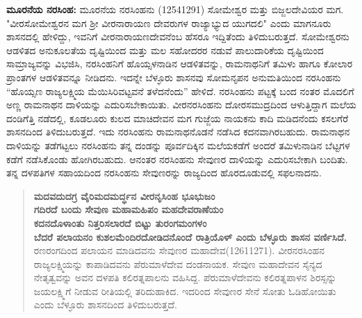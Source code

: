 \textbf{ಮೂರನೆಯ ನರಸಿಂಹ: } ಮೂರನೆಯ ನರಸಿಂಹನು (12541291) ಸೋಮೇಶ್ವರ ಮತ್ತು ಬಿಜ್ಜಲದೇವಿಯರ ಮಗ. "ವೀರಸೋಮೇಶ್ವರನ ಮಗ ಶ‍್ರೀ ವೀರನಾರಾಯಣ ದೇವರುಗಳ ರಾಜ್ಯಾಭ್ಯುದ ಯುಗದಲಿ" ಎಂದು ಮಾಗನೂರು ಶಾಸನದಲ್ಲಿ ಹೇಳಿದ್ದು, ಇವನಿಗೆ ವೀರನಾರಾಯಣದೇವನೆಂಬ ಹೆಸರೂ ಇದ್ದಿತೆಂದು ತಿಳಿದುಬರುತ್ತದೆ. ಸೋಮೇಶ್ವರನು ಆಡಳಿತದ ಅನುಕೂಲತೆಯ ದೃಷ್ಟಿಯಿಂದ ಮತ್ತು ಮಲ ಸಹೋದರರ ನಡುವೆ ಪಾಲುದಾರಿಕೆಯ ದೃಷ್ಟಿಯಿಂದ ಸಾಮ್ರಾಜ್ಯವನ್ನು ವಿಭಜಿಸಿ, ನರಸಿಂಹನಿಗೆ ಹೊಯ್ಸಳನಾಡಿನ ಆಡಳಿತವನ್ನು, ರಾಮನಾಥನಿಗೆ ತಮಿಳು ಹಾಗೂ ಕೋಲಾರ ಪ್ರಾಂತಗಳ ಆಡಳಿತವನ್ನೂ ನೀಡಿದನು. ಇದನ್ನೇ ಬೆಳ್ಳೂರು ಶಾಸನವು ಸೋಮನೃಪನ ಅನುಮತಿಯಿಂದ ನರಸಿಂಹನು “ಹೊಯ್ಸಣ ರಾಜ್ಯಲಕ್ಷ್ಮಿಯ ಮೆಯಿಸಿರಿವಟ್ಟವನೆ ತಳೆದನೆಂದು” ಹೇಳಿದೆ. ನರಸಿಂಹನು ಪಟ್ಟಕ್ಕೆ ಬಂದ ನಂತರ ಮೊದಲಿಗೆ ಅಣ್ಣ ರಾಮನಾಥನ ದಾಳಿಯನ್ನು ಎದುರಿಸಬೇಕಾಯಿತು. ವೀರನರಸಿಂಹನು ದೋರಸಮುದ್ರದಿಂದ ಆಳುತ್ತಿದ್ದಾಗ ಮಲೆಯ ದಂಡಿಗೆತ್ತಿ ನಡೆದಲ್ಲಿ, ಕೂಡಲೂರು ಕುಲದ ಮಾಚಿದೇವನ ಮಗ ಗುಜ್ಜೆಯ ನಾಯಕನು ಕಾದಿ ಮಡಿದನೆಂದು ಕಸಲಗೆರೆ ಶಾಸನದಿಂದ ತಿಳಿದುಬರುತ್ತದೆ. ಇದು ನರಸಿಂಹನು ರಾಮನಾಥನೊಡನೆ ನಡೆಸಿದ ಕದನವಾಗಿರಬಹುದು. ರಾಮನಾಥನ ದಾಳಿಯನ್ನು ತಡೆಗಟ್ಟಲು ನರಸಿಂಹನು ತನ್ನ ದಂಡನ್ನು ಪೂರ್ವದಿಕ್ಕಿನ ಮಲೆಯಕಡೆಗೆ ಅಂದರೆ ತಮಿಳುನಾಡಿನ ಬೆಟ್ಟಗಳ ಕಡೆಗೆ ನಡೆಸಿಕೊಂಡು ಹೋಗಿರಬಹುದು. ಆನಂತರ ನರಸಿಂಹನು ಸೇವುಣರ ದಾಳಿಯನ್ನು ಎದುರಿಸಬೇಕಾಗಿ ಬಂದಿತು. ತನ್ನ ದಳಪತಿಗಳ ಸಹಾಯದಿಂದ ನರಸಿಂಹನು ಸೇವುಣರನ್ನು ರಾಜ್ಯದಿಂದ ಹೊರದೂಡುವಲ್ಲಿ ಸಫಲನಾದನು.

\begin{verse}
\textbf{ಮದವದುದಗ್ರ ವೈರಿಮದಮರ್ದ್ಧನ ವೀರನೃಸಿಂಹ ಭೂಭುಜಂ} \\\textbf{ಗದಿರದೆ ಬಂದು ಸೇವುಣ ಮಹಾಮಹಿಪಂ ಮಹದೇವರಾಣೆಯಂ} \\\textbf{ಕದನದೊಳಾಂತು ನಿತ್ತರಿಸಲಾರದೆ ಬಿಟ್ಟು ತುರಂಗಮಂಗಳಂ} \\\textbf{ಬೆದರೆ ಪಲಾಯನಂ ಕುಶಲಮೆಂದಿರದೋಡಿದನೊಂದೆ ರಾತ್ರಿಯೊಳ್​ ಎಂದು ಬೆಳ್ಳೂರು ಶಾಸನ ವರ್ಣಿಸಿದೆ.} ರಣರಂಗದಿಂದ ಪಲಾಯನ ಮಾಡಿದವನು ಸೇವುಣರ ಮಹಾದೇವ(12611271). ವೀರನರಸಿಂಹನ ರಾಜ್ಯಲಕ್ಷ್ಮಿಯನ್ನು ಕಾಪಾಡಿದವನು ಪೆರುಮಾಳೆದೇವ ದಂಡನಾಯಕ. ಸೇವುಣ ಮಹಾದೇವನ ಸೈನ್ಯದ ನೇತೃತ್ವವನ್ನು ಅವನ ದಳಪತಿ ಕಲಿರತ್ನಪಾಲನು ವಹಿಸಿದ್ದ. ಪೆರುಮಾಳೆದೇವನು ಕಲಿರತ್ನಪಾಳನ ಶಿರಸ್ಸನ್ನು ಜಯಲಕ್ಷ್ಮಿಗೆ ನೀಡುವ ರೀತಿಯಲ್ಲಿ ತರಿದುಹಾಕಿದ. ಇದರಿಂದ ಸೇವುಣರ ಸೇನೆ ಸೋತು ಓಡಿಹೋಯಿತು ಎಂದು ಬೆಳ್ಳೂರು ಶಾಸನದಿಂದ ತಿಳಿದುಬರುತ್ತದೆ.
\end{verse}

